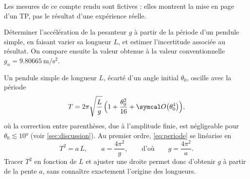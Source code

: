 
\begin{note}
  Les mesures de ce compte rendu sont fictives : elles montrent la mise en
  page d'un TP, pas le résultat d'une expérience réelle.
\end{note}

\begin{objectif}
Déterminer l'accélération de la pesanteur $g$ à partir de la période d'un
pendule simple, en faisant varier sa longueur $L$, et estimer l'incertitude
associée au résultat. On compare ensuite la valeur obtenue à la valeur
conventionnelle $g_{n}=\qty{9.80665}{\metre\per\second\squared}$.
\end{objectif}

\begin{principe}
Un pendule simple de longueur $L$, écarté d'un angle initial $\theta_{0}$,
oscille avec la période
\begin{equation}
  T = 2\pi\sqrt{\frac{L}{g}}\,\Bigl(1+\frac{\theta_{0}^{2}}{16}
      +\bigO{\theta_{0}^{4}}\Bigr),
  \label{eq:periode}
\end{equation}
où la correction entre parenthèses, due à l'amplitude finie, est négligeable
pour $\theta_{0}\lesssim\ang{10}$ (voir \cref{sec:discussion}). Au
premier ordre, \cref{eq:periode} se linéarise en
\begin{equation}
  T^{2} = a\,L,
  \qquad a=\frac{4\pi^{2}}{g},
  \qquad\text{d'où}\qquad
  g=\frac{4\pi^{2}}{a}.
  \label{eq:lineaire}
\end{equation}
Tracer $T^{2}$ en fonction de $L$ et ajuster une droite permet donc
d'obtenir $g$ à partir de la pente $a$, sans connaître exactement
l'origine des longueurs.
\end{principe}

